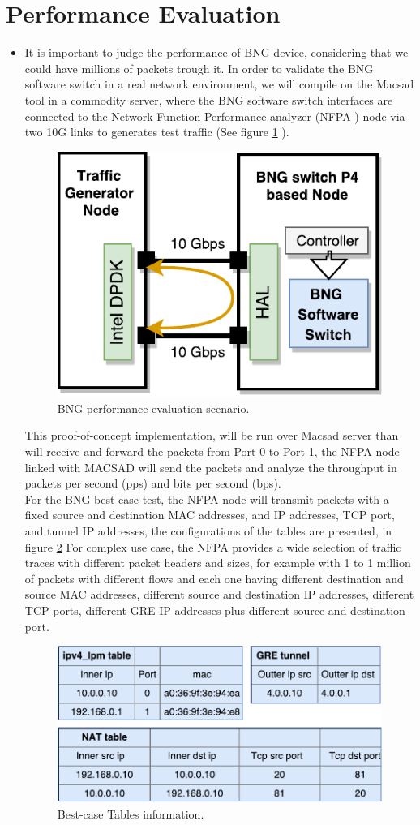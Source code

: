 \section{Performance Evaluation}
\begin{itemize}
	\item It is important to judge the performance of  \acrshort{BNG} device, considering that we could have millions of packets trough it. 
	In order to validate the BNG software switch in a real network environment, we will compile on the Macsad tool in a commodity server, where the BNG software switch interfaces are connected to the Network Function Performance analyzer (NFPA \cite{nfpa}) node  via two 10G links to generates test traffic (See figure \ref{fig:bng_perf} ).
	
	
	\begin{figure}[ht]
		\centering
		\includegraphics[width=0.35\linewidth] 
		{figures/bng_perf.pdf}
		\caption{BNG performance evaluation scenario.}
		\label{fig:bng_perf}
	\end{figure}
	
	This proof-of-concept implementation, will be run over Macsad server than will receive and forward the packets from Port 0 to Port 1, the NFPA node linked with MACSAD will send the packets and analyze the throughput in packets per second (pps) and bits per second (bps).\\
	
	For the BNG best-case test, the NFPA node will transmit packets with a fixed source and destination MAC addresses, and IP addresses, TCP port, and tunnel IP addresses, the configurations of the tables are presented,   in figure \ref{fig:bng_tables}
	For complex use case, the NFPA provides a wide selection of traffic traces with different packet headers and sizes,  for example with 1 to 1 million of packets with different flows and each one having different destination and source MAC addresses, different source and destination IP addresses, different TCP ports, different GRE IP addresses plus
	different source and destination port.
	
	\begin{figure}[ht]
		\centering
		\includegraphics[width=0.6\linewidth] 
		{figures/bng_tables.pdf}
		\caption{Best-case Tables information.}
		\label{fig:bng_tables}
	\end{figure}
	
	
	
\end{itemize}
